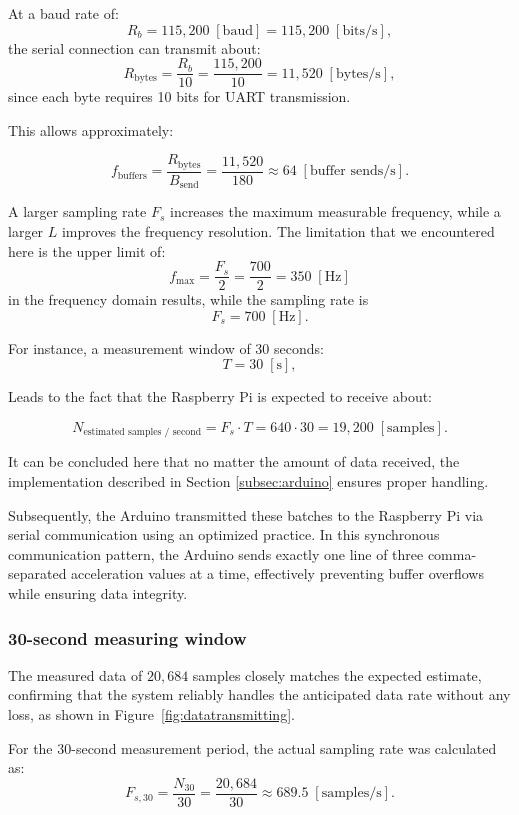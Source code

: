 {	At a baud rate of: 
	\[
	R_b = 115{,}200 \; [\text{baud}] = 115{,}200 \; [\text{bits/s}],
	\]
	the serial connection can transmit about:
	\[
	R_{\text{bytes}} = \frac{R_b}{10} = \frac{115{,}200}{10} = 11{,}520 \; [\text{bytes/s}],
	\]
	since each byte requires 10 bits for UART transmission.
	
	This allows approximately:
	
	\[
	f_{\text{buffers}} = \frac{R_{\text{bytes}}}{B_{\text{send}}} = \frac{11{,}520}{180} \approx 64 \; [\text{buffer sends/s}].
	\]
	
	A larger sampling rate \(F_s\) increases the maximum measurable frequency, while a larger \(L\) improves the frequency resolution. The limitation that we encountered here is the upper limit of:
	\[
	f_{\max} = \frac{F_s}{2} = \frac{700}{2} = 350 \; [\text{Hz}]
	\]
	in the frequency domain results, while the sampling rate is
	\[
	F_s = 700 \; [\text{Hz}].
	\]
		
	For instance, a measurement window of 30 seconds:
	\[
	T = 30 \; [\text{s}],
	\]
	
	Leads to the fact that the Raspberry Pi is expected to receive about:
	
	\[
	N_{\text{estimated samples / second}} = F_s \cdot T = 640 \cdot 30 = 19{,}200 \; [\text{samples}].
	\]
	
	It can be concluded here that no matter the amount of data received, the implementation described in Section \ref{subsec:arduino} ensures proper handling.
	
	Subsequently, the Arduino transmitted these batches to the Raspberry Pi via serial communication using an optimized practice. In this synchronous communication pattern, the Arduino sends exactly one line of three comma-separated acceleration values at a time, effectively preventing buffer overflows while ensuring data integrity.
	
	
	\subsubsection{30-second measuring window}
	{
		The measured data of $20{,}684$ samples closely matches the expected estimate, confirming that the system reliably handles the anticipated data rate without any loss, as shown in Figure~\ref{fig:datatransmitting}.
		
		For the 30-second measurement period, the actual sampling rate was calculated as:
		\[
		F_{s,30} = \frac{N_{30}}{30} = \frac{20{,}684}{30} \approx 689.5 \; [\text{samples/s}].
		\]
		
}}
